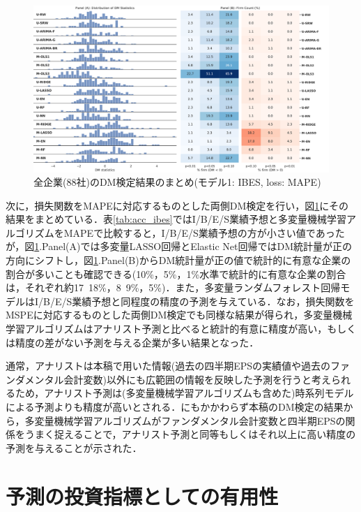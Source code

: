 \documentclass[a4paper，12pt]{jsarticle}
\begin{document}
\begin{figure}
  \centering
  \caption{全企業(88社)のDM検定結果のまとめ(モデル1: IBES, loss: MAPE)}
  \label{fig:dm_ibes_mape}
  \includegraphics[width=15cm]{./img/_dm_MAPE_y_hat_ibes.pdf}
\end{figure}

次に，損失関数をMAPEに対応するものとした両側DM検定を行い，図\ref{fig:dm_ibes_mape}にその結果をまとめている．表\ref{tab:acc_ibes}ではI/B/E/S業績予想と多変量機械学習アルゴリズムをMAPEで比較すると，I/B/E/S業績予想の方が小さい値であったが，図\ref{fig:dm_ibes_mape}.Panel(A)では多変量LASSO回帰とElastic Net回帰ではDM統計量が正の方向にシフトし，図\ref{fig:dm_ibes_mape}.Panel(B)からDM統計量が正の値で統計的に有意な企業の割合が多いことも確認できる(10\%，5\%，1\%水準で統計的に有意な企業の割合は，それぞれ約17~18\%，8~9\%，5\%)．また，多変量ランダムフォレスト回帰モデルはI/B/E/S業績予想と同程度の精度の予測を与えている．なお，損失関数をMSPEに対応するものとした両側DM検定でも同様な結果が得られ，多変量機械学習アルゴリズムはアナリスト予測と比べると統計的有意に精度が高い，もしくは精度の差がない予測を与える企業が多い結果となった．

通常，アナリストは本稿で用いた情報(過去の四半期EPSの実績値や過去のファンダメンタル会計変数)以外にも広範囲の情報を反映した予測を行うと考えられるため\citep{sakurai1990}，アナリスト予測は(多変量機械学習アルゴリズムも含めた)時系列モデルによる予測よりも精度が高いとされる．にもかかわらず本稿のDM検定の結果から，多変量機械学習アルゴリズムがファンダメンタル会計変数と四半期EPSの関係をうまく捉えることで，アナリスト予測と同等もしくはそれ以上に高い精度の予測を与えることが示された．

\part{予測の投資指標としての有用性} \label{par:portfolio}
\end{document}
